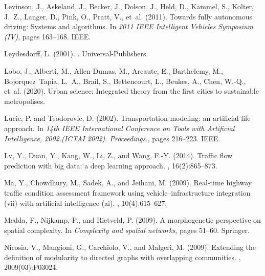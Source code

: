 \documentclass[letterpaper]{article}
\begin{document}
\begin{thebibliography}{}
Levinson, J., Askeland, J., Becker, J., Dolson, J., Held, D., Kammel, S.,
  Kolter, J.~Z., Langer, D., Pink, O., Pratt, V., et~al. (2011).
\newblock Towards fully autonomous driving: Systems and algorithms.
\newblock In {\em 2011 IEEE Intelligent Vehicles Symposium (IV)}, pages
  163--168. IEEE.

Leydesdorff, L. (2001).
.
\newblock Universal-Publishers.

Lobo, J., Alberti, M., Allen-Dumas, M., Arcaute, E., Barthelemy, M.,
  Bojorquez~Tapia, L.~A., Brail, S., Bettencourt, L., Beukes, A., Chen, W.-Q.,
  et~al. (2020).
\newblock Urban science: Integrated theory from the first cities to sustainable
  metropolises.

Lucic, P. and Teodorovic, D. (2002).
\newblock Transportation modeling: an artificial life approach.
\newblock In {\em 14th IEEE International Conference on Tools with Artificial
  Intelligence, 2002.(ICTAI 2002). Proceedings.}, pages 216--223. IEEE.

Lv, Y., Duan, Y., Kang, W., Li, Z., and Wang, F.-Y. (2014).
\newblock Traffic flow prediction with big data: a deep learning approach.
,
  16(2):865--873.

Ma, Y., Chowdhury, M., Sadek, A., and Jeihani, M. (2009).
\newblock Real-time highway traffic condition assessment framework using
  vehicle--infrastructure integration (vii) with artificial intelligence (ai).
,
  10(4):615--627.

Medda, F., Nijkamp, P., and Rietveld, P. (2009).
\newblock A morphogenetic perspective on spatial complexity.
\newblock In {\em Complexity and spatial networks}, pages 51--60. Springer.

Nicosia, V., Mangioni, G., Carchiolo, V., and Malgeri, M. (2009).
\newblock Extending the definition of modularity to directed graphs with
  overlapping communities.
,
  2009(03):P03024.


\end{thebibliography}
\end{document}
